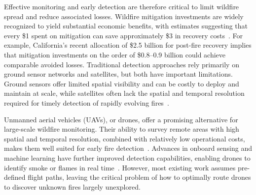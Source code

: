 \documentclass[pdflatex,sn-mathphys-num]{sn-jnl}%
\theoremstyle{thmstyleone}%
\theoremstyle{thmstyletwo}%
\theoremstyle{thmstylethree}%
\begin{document}

Effective monitoring and early detection are therefore critical to limit wildfire spread and reduce associated losses. Wildfire mitigation investments are widely recognized to yield substantial economic benefits, with estimates suggesting that every \$1 spent on mitigation can save approximately \$3 in recovery costs~\citep{next10_rebuilding_resilient_2021}. For example, California’s recent allocation of \$2.5 billion for post-fire recovery implies that mitigation investments on the order of \$0.8–0.9 billion could achieve comparable avoided losses. Traditional detection approaches rely primarily on ground sensor networks and satellites, but both have important limitations. Ground sensors offer limited spatial visibility and can be costly to deploy and maintain at scale, while satellites often lack the spatial and temporal resolution required for timely detection of rapidly evolving fires~\citep{WildfireDetectionBouguettaya}.

Unmanned aerial vehicles (UAVs), or drones, offer a promising alternative for large-scale wildfire monitoring. Their ability to survey remote areas with high spatial and temporal resolution, combined with relatively low operational costs, makes them well suited for early fire detection~\citep{WildfireDetectionBouguettaya,WildfireDetectionDLGhali22}. Advances in onboard sensing and machine learning have further improved detection capabilities, enabling drones to identify smoke or flames in real time~\citep{WildfireDetectionDLKim,WildfireDetectionDLKumar24,WildfireDetectionDLYang}. However, most existing work assumes pre-defined flight paths, leaving the critical problem of how to optimally route drones to discover unknown fires largely unexplored.

\end{document}
